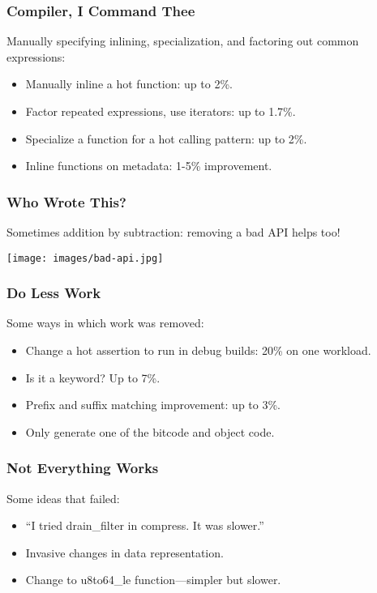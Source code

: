 \begin{frame}
\frametitle{Compiler, I Command Thee}

 Manually specifying inlining, specialization, and factoring out common expressions:
\begin{itemize}
	\item Manually inline a hot function: up to 2\%.
	\item Factor repeated expressions, use iterators: up to 1.7\%.
	\item Specialize a function for a hot calling pattern: up to 2\%.
	\item Inline functions on metadata: 1-5\% improvement.
\end{itemize}


\end{frame}


\begin{frame}
\frametitle{Who Wrote This?}

Sometimes addition by subtraction: removing a bad API helps too!

\begin{center}
	\texttt{[image: images/bad-api.jpg]}
\end{center}


\end{frame}


\begin{frame}
\frametitle{Do Less Work}

Some ways in which work was removed:

\begin{itemize}
	\item Change a hot assertion to run in debug builds: 20\% on one workload.
	\item Is it a keyword? Up to 7\%.
	\item Prefix and suffix matching improvement: up to 3\%.
	\item Only generate one of the bitcode and object code.
\end{itemize}


\end{frame}


\begin{frame}
\frametitle{Not Everything Works}

Some ideas that failed:

\begin{itemize}
	\item ``I tried drain\_filter in compress. It was slower.''
	\item Invasive changes in data representation.
	\item Change to u8to64\_le function---simpler but slower.
\end{itemize}

\end{frame}


